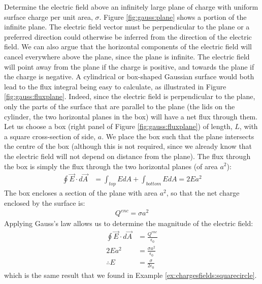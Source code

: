 \newpage
\begin{example}{Determine the electric field above an infinitely large plane of charge with uniform surface charge per unit area, $\sigma$.} \label{ex:gauss:infiniteplate}
Figure \ref{fig:gauss:plane} shows a portion of the infinite plane. The electric field vector must be perpendicular to the plane or a preferred direction could otherwise be inferred from the direction of the electric field. We can also argue that the horizontal components of the electric field will cancel everywhere above the plane, since the plane is infinite. The electric field will point away from the plane if the charge is positive, and towards the plane if the charge is negative. 
A cylindrical or box-shaped Gaussian surface would both lead to the flux integral being easy to calculate, as illustrated in Figure \ref{fig:gauss:fluxplane}. Indeed, since the electric field is perpendicular to the plane, only the parts of the surface that are parallel to the plane (the lids on the cylinder, the two horizontal planes in the box) will have a net flux through them.
Let us choose a box (right panel of Figure \ref{fig:gauss:fluxplane}) of length, $L$, with a square cross-section of side, $a$. We place the box such that the plane intersects the centre of the box (although this is not required, since we already know that the electric field will not depend on distance from the plane). The flux through the box is simply the flux through the two horizontal planes (of area $a^2$):
\begin{align*}
\oint \vec E\cdot d\vec A&= \int_{top} EdA+\int_{bottom}EdA=2Ea^2
\end{align*}
The box encloses a section of the plane with area $a^2$, so that the net charge enclosed by the surface is:
\begin{align*}
Q^{enc}=\sigma a^2
\end{align*}
Applying Gauss's law allows us to determine the magnitude of the electric field:
\begin{align*}
\oint \vec E\cdot d\vec A&=\frac{Q^{enc}}{\epsilon_0} \\
2Ea^2&= \frac{\sigma a^2}{\epsilon_0}\\
\therefore E&= \frac{\sigma}{2\epsilon_0}
\end{align*}
which is the same result that we found in Example \ref{ex:chargesfields:squarecircle}.


\end{example}
